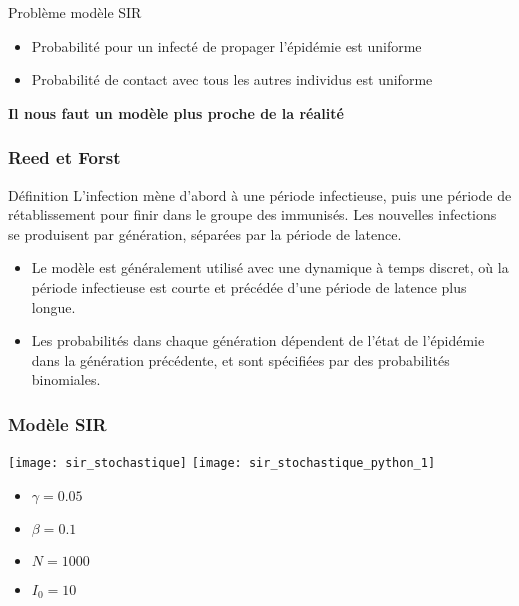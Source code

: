\begin{frame}
    \begin{block}{Problème modèle SIR}
        \begin{itemize}
            \item Probabilité pour un infecté de propager l'épidémie est uniforme
            \item Probabilité de contact avec tous les autres individus est uniforme
        \end{itemize}
    \end{block}

    \begin{center}
        \bf Il nous faut un modèle plus proche de la réalité
    \end{center}
\end{frame}


\begin{frame}
    \frametitle{Reed et Forst}

    \begin{block}{Définition}
        L'infection mène d'abord à une période infectieuse, puis une période de rétablissement pour finir dans le groupe des immunisés. Les nouvelles infections se produisent par génération, séparées par la période de latence.
    \end{block}

    \begin{itemize}
        \item Le modèle est généralement utilisé avec une dynamique à temps discret, où la période infectieuse est courte et précédée d’une période de latence plus longue.
        \item Les probabilités dans chaque génération dépendent de l’état de l’épidémie dans la génération précédente, et sont spécifiées par des probabilités binomiales.
    \end{itemize}
\end{frame}

\begin{frame}
        \frametitle{Modèle SIR}

		\texttt{[image: sir\_stochastique]}
		\texttt{[image: sir\_stochastique\_python\_1]}

        \begin{multicols}{2}
            \begin{itemize}
                    \item $\gamma = 0.05$
                    \item $\beta = 0.1$
                    \item $N = 1000$
                    \item $I_0 = 10$
            \end{itemize}
        \end{multicols}

\end{frame}

